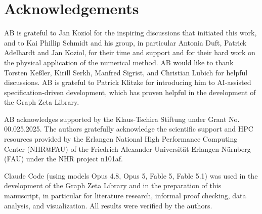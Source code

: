 \documentclass[]{amsart}
\numberwithin{mythm}{section}
\begin{document}
\section*{Acknowledgements}
AB is grateful to Jan Koziol for the inspiring discussions that initiated this work, and to Kai Phillip Schmidt and his group, in particular Antonia Duft, Patrick Adelhardt and Jan Koziol, for their time and support and for their hard work on the physical application of the numerical method. AB would like to thank Torsten Keßler, Kirill Serkh, Manfred Sigrist, and Christian Lubich for helpful discussions.  AB is grateful to Patrick Klitzke for introducing him to AI-assisted specification-driven development, which has proven helpful in the development of the Graph Zeta Library.

AB acknowledges supported by the Klaus-Tschira Stiftung under Grant No. 00.025.2025. The authors gratefully acknowledge the scientific support and HPC
resources provided by the Erlangen National High Performance Computing Center (NHR@FAU) of the Friedrich-Alexander-Universität Erlangen-Nürnberg (FAU)
under the NHR project n101af.

Claude Code (using models Opus 4.8, Opus 5, Fable 5, Fable 5.1) was used in the development of the Graph Zeta Library and in the preparation of this manuscript, in particular for literature research, informal proof checking, data analysis, and visualization. All results were verified by the authors.

\printbibliography

\appendix
\end{document}

